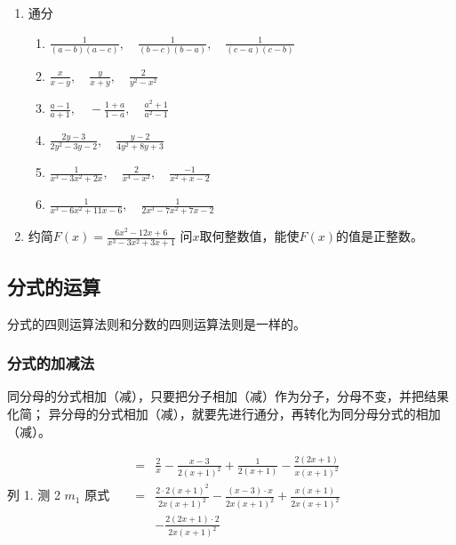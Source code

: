 \begin{ex}
\begin{enumerate}
\item  通分
\begin{enumerate}
\item  $\frac{1}{(a-b)(a-c)},\quad  \frac{1}{(b-c)(b-a)}, \quad \frac{1}{(c-a)(c-b)}$
\item $\frac{x}{x-y},\quad  \frac{y}{x+y}, \quad \frac{2}{y^{2}-x^{2}}$
\item  $\frac{a-1}{a+1},\quad -\frac{1+a}{1-a}, \quad \frac{a^{2}+1}{a^{2}-1}$
\item  $\frac{2 y-3}{2 y^{2}-3 y-2}, \quad \frac{y-2}{4 y^{2}+8 y+3}$
\item  $\frac{1}{x^{3}-3 x^{2}+2 x}, \quad \frac{2}{x^{4}-x^{2}}, \quad \frac{-1}{x^{2}+x-2}$
\item  $\frac{1}{x^{3}-6 x^{2}+11 x-6}, \quad \frac{1}{2 x^{3}-7 x^{2}+7 x-2}$
\end{enumerate}

\item 约简$F(x)=\frac{6x^2-12x+6}{x^3-3x^2+3x+1}$ 问$x$取何整数值，能使$F(x)$的值是正整数。
\end{enumerate}
\end{ex}

\subsection{分式的运算}
分式的四则运算法则和分数的四则运算法则是一样的。

\subsubsection{分式的加减法}

同分母的分式相加（减），只要把分子相加（减）作为分子，分母不变，并把结果化简；
异分母的分式相加（减），就要先进行通分，再转化为同分母分式的相加（减）。

列 1. 
测 2 
$m_{1}$ 原式 $\quad$ $\begin{aligned}=& \frac{2}{x}-\frac{x-3}{2(x+1)^{2}}+\frac{1}{2(x+1)}-\frac{2(2 x+1)}{x(x+1)^{2}} \\=& \frac{2 \cdot 2(x+1)^{2}}{2 x(x+1)^{2}}-\frac{(x-3) \cdot x}{2 x(x+1)^{2}}+\frac{x(x+1)}{2 x(x+1)^{2}} \\ &-\frac{2(2 x+1) \cdot 2}{2 x(x+1)^{2}} \end{aligned}$


